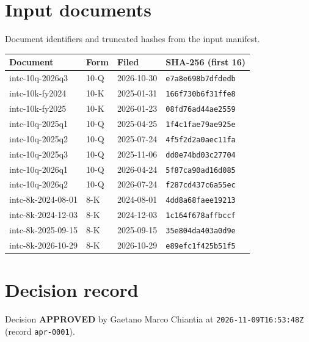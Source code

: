 \documentclass[11pt,a4paper]{article}
\begin{document}
\section*{Input documents}
{\sffamily\small\color{muted} Document identifiers and truncated hashes from the input manifest.}\par
{\sffamily\small \begin{tabular}{@{}llll@{}}
\toprule
Document & Form & Filed & SHA-256 (first 16) \\
\midrule
intc-10q-2026q3 & 10-Q & 2026-10-30 & \texttt{e7a8e698b7dfdedb} \\
intc-10k-fy2024 & 10-K & 2025-01-31 & \texttt{166f730b6f31ffe8} \\
intc-10k-fy2025 & 10-K & 2026-01-23 & \texttt{08fd76ad44ae2559} \\
intc-10q-2025q1 & 10-Q & 2025-04-25 & \texttt{1f4c1fae79ae925e} \\
intc-10q-2025q2 & 10-Q & 2025-07-24 & \texttt{4f5f2d2a0aec11fa} \\
intc-10q-2025q3 & 10-Q & 2025-11-06 & \texttt{dd0e74bd03c27704} \\
intc-10q-2026q1 & 10-Q & 2026-04-24 & \texttt{5f87ca90ad16d085} \\
intc-10q-2026q2 & 10-Q & 2026-07-24 & \texttt{f287cd437c6a55ec} \\
intc-8k-2024-08-01 & 8-K & 2024-08-01 & \texttt{4dd8a68faee19213} \\
intc-8k-2024-12-03 & 8-K & 2024-12-03 & \texttt{1c164f678affbccf} \\
intc-8k-2025-09-15 & 8-K & 2025-09-15 & \texttt{35e804da403a0d9e} \\
intc-8k-2026-10-29 & 8-K & 2026-10-29 & \texttt{e89efc1f425b51f5} \\
\bottomrule
\end{tabular}}
\section*{Decision record}
Decision \textbf{APPROVED} by Gaetano Marco Chiantia at \texttt{2026-11-09T16:53:48Z} (record \texttt{apr-0001}).
\end{document}
